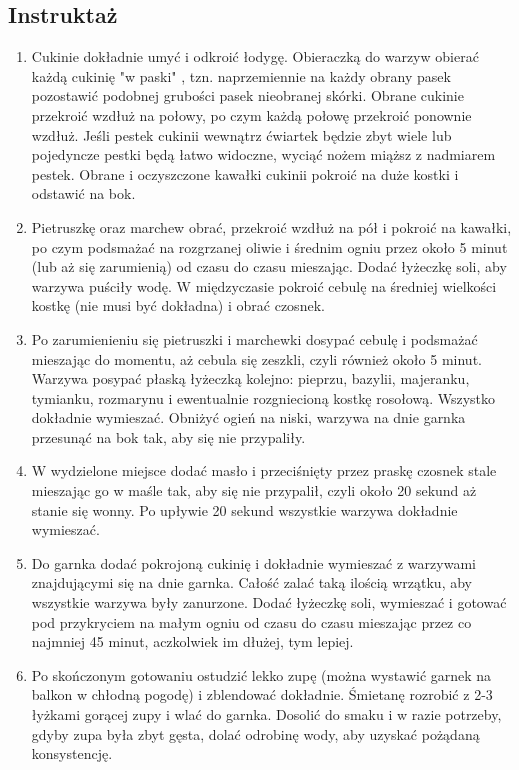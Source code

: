 \subsection*{Instruktaż}
\begin{enumerate}
    \item Cukinie dokładnie umyć i odkroić łodygę. Obieraczką do warzyw obierać każdą cukinię "w paski" , tzn. naprzemiennie na każdy obrany pasek pozostawić podobnej grubości pasek nieobranej skórki. Obrane cukinie przekroić wzdłuż na połowy, po czym każdą połowę przekroić ponownie wzdłuż. Jeśli pestek cukinii wewnątrz ćwiartek będzie zbyt wiele lub pojedyncze pestki będą łatwo widoczne, wyciąć nożem miąższ z nadmiarem pestek. Obrane i oczyszczone kawałki cukinii pokroić na duże kostki i odstawić na bok.
    \item Pietruszkę oraz marchew obrać, przekroić wzdłuż na pół i pokroić na kawałki, po czym podsmażać na rozgrzanej oliwie i średnim ogniu przez około 5 minut (lub aż się zarumienią) od czasu do czasu mieszając. Dodać łyżeczkę soli, aby warzywa puściły wodę. W międzyczasie pokroić cebulę na średniej wielkości kostkę (nie musi być dokładna) i obrać czosnek.
    \item Po zarumienieniu się pietruszki i marchewki dosypać cebulę i podsmażać mieszając do momentu, aż cebula się zeszkli, czyli również około 5 minut. Warzywa posypać płaską łyżeczką kolejno: pieprzu, bazylii, majeranku, tymianku, rozmarynu i ewentualnie rozgniecioną kostkę rosołową. Wszystko dokładnie wymieszać. Obniżyć ogień na niski, warzywa na dnie garnka przesunąć na bok tak, aby się nie przypaliły.
    \item W wydzielone miejsce dodać masło i przeciśnięty przez praskę czosnek stale mieszając go w maśle tak, aby się nie przypalił, czyli około 20 sekund aż stanie się wonny. Po upływie 20 sekund wszystkie warzywa dokładnie wymieszać.
    \item Do garnka dodać pokrojoną cukinię i dokładnie wymieszać z warzywami znajdującymi się na dnie garnka. Całość zalać taką ilością wrzątku, aby wszystkie warzywa były zanurzone. Dodać łyżeczkę soli, wymieszać i gotować pod przykryciem na małym ogniu od czasu do czasu mieszając przez co najmniej 45 minut, aczkolwiek im dłużej, tym lepiej.
    \item Po skończonym gotowaniu ostudzić lekko zupę (można wystawić garnek na balkon w chłodną pogodę) i zblendować dokładnie. Śmietanę rozrobić z 2-3 łyżkami gorącej zupy i wlać do garnka. Dosolić do smaku i w razie potrzeby, gdyby zupa była zbyt gęsta, dolać odrobinę wody, aby uzyskać pożądaną konsystencję.
\end{enumerate}

